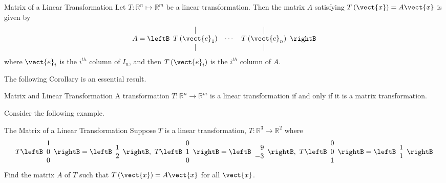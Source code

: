 \begin{theorem}{Matrix of a Linear Transformation}\label{thm:matrixoflineartransformation}
Let $T: \mathbb{R}^{n} \mapsto \mathbb{R}^{m}$ be a linear transformation. Then the matrix $A$ satisfying $T\left(\vect{x}\right)=A\vect{x}$ is given by
\begin{equation*}
A=
\leftB
\begin{array}{ccc}
| &  & | \\
T\left( \vect{e}_{1}\right) & \cdots & T\left( \vect{e}_{n}\right) \\
| &  & |
\end{array}
\rightB
\end{equation*}
where $\vect{e}_{i}$ is the $i^{th}$ column of $I_n$, and then $T\left( \vect{e}_{i}
\right)$ is the $i^{th}$ column of $A.$
\end{theorem}

The following Corollary is an essential result.

\begin{corollary}{Matrix and Linear Transformation}\label{cor:matrixlintransfequivalence}
A transformation $T:\mathbb{R}^n\rightarrow \mathbb{R}^m$ is a linear transformation if and only if it is a matrix transformation. 
\end{corollary}

Consider the following example.

\begin{example}{The Matrix of a Linear Transformation}\label{exa:matrixoflineartransformation}
Suppose $T$ is a linear transformation, $T:\mathbb{R}^{3}\rightarrow \mathbb{
R}^{2}$ where 
\begin{equation*}
T\leftB
\begin{array}{r}
1 \\
0 \\
0
\end{array}
\rightB =\leftB
\begin{array}{r}
1 \\
2
\end{array}
\rightB ,\ T\leftB
\begin{array}{r}
0 \\
1 \\
0
\end{array}
\rightB =\leftB
\begin{array}{r}
9 \\
-3
\end{array}
\rightB ,\ T\leftB
\begin{array}{r}
0 \\
0 \\
1
\end{array}
\rightB =\leftB
\begin{array}{r}
1 \\
1
\end{array}
\rightB
\end{equation*}
Find the matrix $A$ of $T$ such that $T \left( \vect{x} \right)=A\vect{x}$  for all $\vect{x}$.
\end{example}

